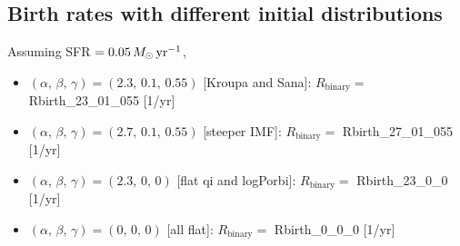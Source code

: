 \documentclass{article}
\begin{document}
\subsection*{\huge  Birth rates with different initial distributions}

Assuming SFR $=0.05\,M_\odot\,{\rm yr}^{-1}$,
\begin{itemize}
	\item $(\alpha,\,\beta,\,\gamma)=(2.3,\,0.1,\,0.55)$ [Kroupa and Sana]: 
		$R_\mathrm{binary}=$
		{Rbirth_23_01_055} [1/yr]
	\item $(\alpha,\,\beta,\,\gamma)=(2.7,\,0.1,\,0.55)$ [steeper IMF]: 
		$R_\mathrm{binary}=$
		{Rbirth_27_01_055} [1/yr]
	\item $(\alpha,\,\beta,\,\gamma)=(2.3,\,0,\,0)$ [flat qi and logPorbi]: 
		$R_\mathrm{binary}=$
		{Rbirth_23_0_0} [1/yr]
	\item $(\alpha,\,\beta,\,\gamma)=(0,\,0,\,0)$ [all flat]: 
		$R_\mathrm{binary}=$
		{Rbirth_0_0_0} [1/yr]
\end{itemize}
\end{document}
